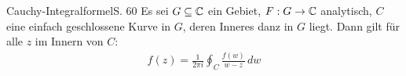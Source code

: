 \begin{satz}{Cauchy-Integralformel}{S. 60}
  Es sei $G \subseteq \mathbb{C}$ ein Gebiet, $F: G \to \mathbb{C}$ analytisch, $C$ eine einfach geschlossene Kurve in $G$, deren Inneres danz in $G$ liegt.
  Dann gilt für alle $z$ im Innern von $C$:
  \begin{align}
    f(z) = \frac{1}{2 \pi i} \oint_C \frac{f(w)}{w-z} \, dw
  \end{align}
\end{satz}
